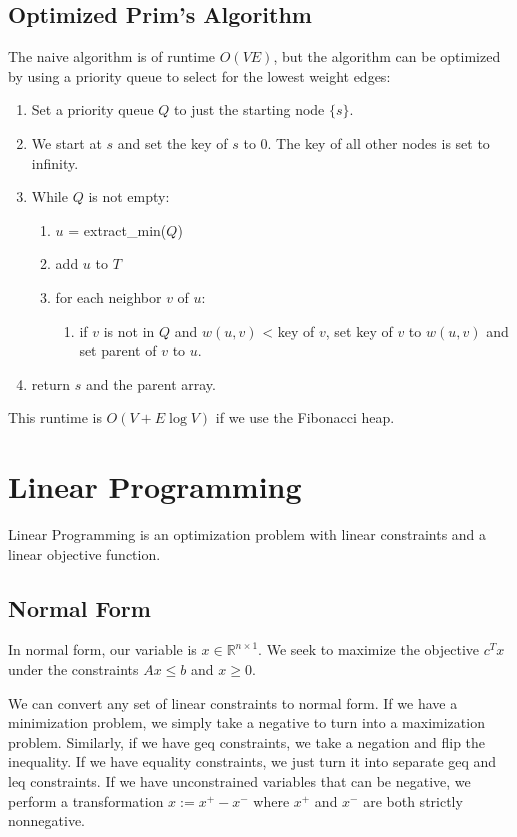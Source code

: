\documentclass[10pt]{article}
\begin{document}
\subsection*{Optimized Prim’s Algorithm}
The naive algorithm is of runtime $O(VE)$, but the algorithm can be optimized by using a priority queue to select for the lowest weight edges:
\begin{enumerate}
    \item Set a priority queue $Q$ to just the starting node $\{s\}$.
    \item We start at $s$ and set the key of $s$ to 0. The key of all other nodes is set to infinity.
    \item While $Q$ is not empty:
    \begin{enumerate}
        \item $u$ = extract\_min($Q$)
        \item add $u$ to $T$
        \item for each neighbor $v$ of $u$:
        \begin{enumerate}
             \item if $v$ is not in $Q$ and $w(u, v)$ < key of $v$, set key of $v$ to $w(u, v)$ and set parent of $v$ to $u$.
        \end{enumerate}
    \end{enumerate}
    \item return $s$ and the parent array.
\end{enumerate}

This runtime is $O(V + E \log V)$ if we use the Fibonacci heap.

\section{Linear Programming}
Linear Programming is an optimization problem with linear constraints and a linear objective function.
\subsection*{Normal Form}
In normal form, our variable is $x \in \mathbb{R}^{n \times 1}$. We seek to maximize the objective $c^T x$ under the constraints $Ax \leq b$ and $x \geq 0$.

We can convert any set of linear constraints to normal form. If we have a minimization problem, we simply take a negative to turn into a maximization problem. Similarly, if we have geq constraints, we take a negation and flip the inequality. If we have equality constraints, we just turn it into separate geq and leq constraints. If we have unconstrained variables that can be negative, we perform a transformation $x := x^+ - x^-$ where $x^+$ and $x^-$ are both strictly nonnegative.
\end{document}
